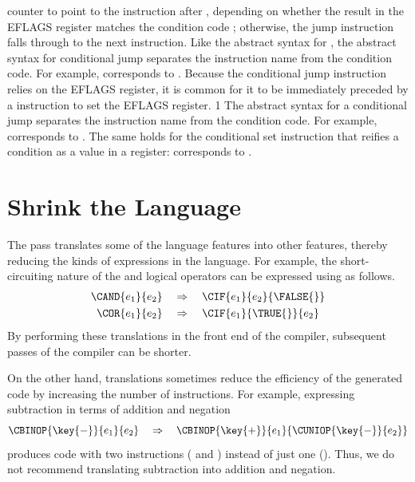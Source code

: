 \documentclass[7x10]{TimesAPriori_MIT}%
\def\riscvEd{1}
\def\architecture{1}
\numberwithin{theorem}{chapter}
\numberwithin{definition}{chapter}
\numberwithin{equation}{chapter}
\begin{document}
counter to point to the instruction after , depending on
whether the result in the EFLAGS register matches the condition code
; otherwise, the jump instruction falls through to the next
instruction.  Like the abstract syntax for , 
the abstract
syntax for conditional jump separates the instruction name from the
condition code. For example, 
corresponds to .  Because the conditional jump instruction
relies on the EFLAGS register, it is common for it to be immediately preceded by
a  instruction to set the EFLAGS register.
\fi
\if\architecture\riscvEd
The abstract syntax for a conditional jump separates the instruction name from the
condition code. For example, 
corresponds to . The same holds for the
conditional set instruction that reifies a condition as a value in a
register:  corresponds to
.
\fi


\section{Shrink the \LangIf{} Language}
\label{sec:shrink-Lif}

The  pass translates some of the language features into
other features, thereby reducing the kinds of expressions in the
language. For example, the short-circuiting nature of the 
and  logical operators can be expressed using  as
follows.
\begin{align*}
  \CAND{e_1}{e_2} & \quad \Rightarrow \quad \CIF{e_1}{e_2}{\FALSE{}}\\
  \COR{e_1}{e_2} & \quad \Rightarrow \quad \CIF{e_1}{\TRUE{}}{e_2}
\end{align*}
By performing these translations in the front end of the compiler,
subsequent passes of the compiler can be shorter.

On the other hand, translations sometimes reduce the efficiency of the
generated code by increasing the number of instructions. For example,
expressing subtraction in terms of addition and negation
\[
\CBINOP{\key{-}}{e_1}{e_2} \quad \Rightarrow \quad
  \CBINOP{\key{+}}{e_1}{ \CUNIOP{\key{-}}{e_2} }
\]
produces code with two {\ArchName} instructions (\INEG{} and \IADD)
instead of just one (\ISUB). Thus, we do not recommend
translating subtraction into addition and negation.
\end{document}
